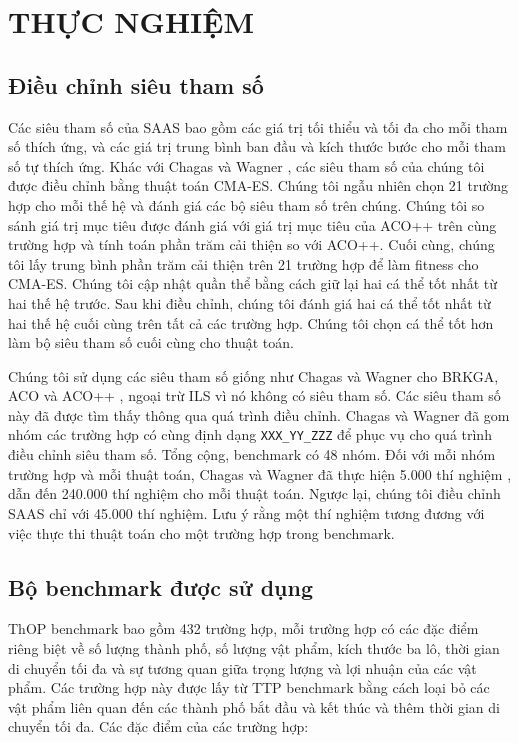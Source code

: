 \chapter{THỰC NGHIỆM} \label{chapter:ExperimentalSettings}


\section{Điều chỉnh siêu tham số} \label{sec:hyperparametersTuning}
Các siêu tham số của SAAS bao gồm các giá trị tối thiểu và tối đa cho mỗi tham số thích ứng, và các giá trị trung bình ban đầu và kích thước bước cho mỗi tham số tự thích ứng. Khác với Chagas và Wagner \cite{Chagas2021}, các siêu tham số của chúng tôi được điều chỉnh bằng thuật toán CMA-ES. Chúng tôi ngẫu nhiên chọn 21 trường hợp cho mỗi thế hệ và đánh giá các bộ siêu tham số trên chúng. Chúng tôi so sánh giá trị mục tiêu được đánh giá với giá trị mục tiêu của ACO++ trên cùng trường hợp và tính toán phần trăm cải thiện so với ACO++. Cuối cùng, chúng tôi lấy trung bình phần trăm cải thiện trên 21 trường hợp để làm fitness cho CMA-ES. Chúng tôi cập nhật quần thể bằng cách giữ lại hai cá thể tốt nhất từ hai thế hệ trước. Sau khi điều chỉnh, chúng tôi đánh giá hai cá thể tốt nhất từ hai thế hệ cuối cùng trên tất cả các trường hợp. Chúng tôi chọn cá thể tốt hơn làm bộ siêu tham số cuối cùng cho thuật toán.

Chúng tôi sử dụng các siêu tham số giống như Chagas và Wagner cho BRKGA, ACO và ACO++ \cite{Chagas2021}, ngoại trừ ILS vì nó không có siêu tham số. Các siêu tham số này đã được tìm thấy thông qua quá trình điều chỉnh. Chagas và Wagner đã gom nhóm các trường hợp có cùng định dạng \texttt{XXX\_YY\_ZZZ} để phục vụ cho quá trình điều chỉnh siêu tham số. Tổng cộng, benchmark có 48 nhóm. Đối với mỗi nhóm trường hợp và mỗi thuật toán, Chagas và Wagner đã thực hiện 5.000 thí nghiệm \cite{Chagas2021}, dẫn đến 240.000 thí nghiệm cho mỗi thuật toán. Ngược lại, chúng tôi điều chỉnh SAAS 
chỉ với 45.000 thí nghiệm. Lưu ý rằng một thí nghiệm tương đương với việc thực thi thuật toán cho một trường hợp trong benchmark.



\section{Bộ benchmark được sử dụng} \label{sec:problem}
ThOP benchmark \cite{8477853} bao gồm 432 trường hợp, mỗi trường hợp có các đặc điểm riêng biệt về số lượng thành phố, số lượng vật phẩm, kích thước ba lô, thời gian di chuyển tối đa và sự tương quan giữa trọng lượng và lợi nhuận của các vật phẩm. Các trường hợp này được lấy từ TTP benchmark \cite{10.1145/2576768.2598249} bằng cách loại bỏ các vật phẩm liên quan đến các thành phố bắt đầu và kết thúc và thêm thời gian di chuyển tối đa. Các đặc điểm của các trường hợp:


